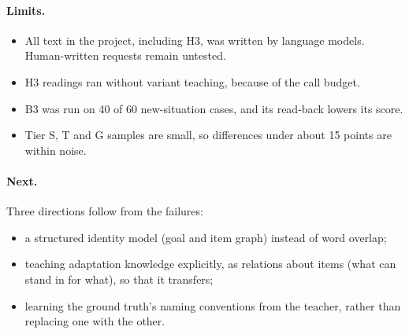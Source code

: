 \paragraph{Limits.}
\begin{itemize}
  \item All text in the project, including H3, was written by language models. Human-written requests remain untested.
  \item H3 readings ran without variant teaching, because of the call budget.
  \item B3 was run on 40 of 60 new-situation cases, and its read-back lowers its score.
  \item Tier S, T and G samples are small, so differences under about 15 points are within noise.
\end{itemize}

\paragraph{Next.} Three directions follow from the failures:
\begin{itemize}
  \item a structured identity model (goal and item graph) instead of word overlap;
  \item teaching adaptation knowledge explicitly, as relations about items (what can stand in for what), so that it transfers;
  \item learning the ground truth's naming conventions from the teacher, rather than replacing one with the other.
\end{itemize}

